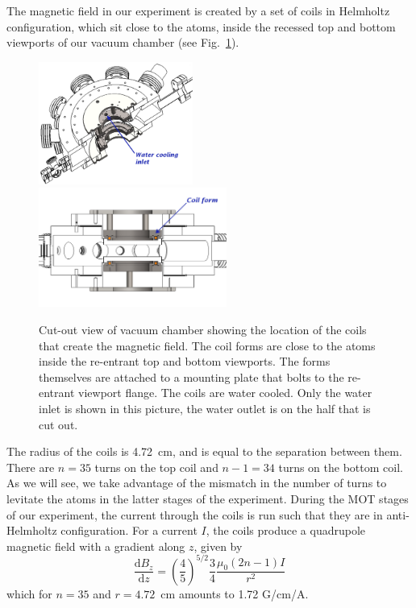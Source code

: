 The magnetic field in our experiment is created by a set of coils in
Helmholtz configuration, which sit close to the atoms, inside the recessed top
and bottom viewports of our vacuum chamber (see Fig.~\ref{fig:coilforms}).
\begin{figure} 
\includegraphics[width=0.45\textwidth]{../masters-figures/coils/angleview.pdf}
\includegraphics[width=0.55\textwidth]{../masters-figures/coils/sideview.pdf}
\caption[Location of magnetic field coil forms ]{\small Cut-out view of vacuum
chamber showing the location of the coils that create the magnetic field.   The
coil forms are close to the atoms inside the re-entrant top and bottom
viewports.  The forms themselves are attached to a mounting plate that bolts to
the re-entrant viewport flange.  The coils are water cooled.  Only  the water
inlet is shown in this picture, the water outlet is on the half that is cut
out. }
\label{fig:coilforms} 
\end{figure} 
The radius of the coils is 4.72~cm, and is equal to the separation between
them.  There are $n=35$ turns on the top coil and $n-1=34$ turns on the bottom
coil.  As we will see, we take advantage of the mismatch in the number of turns
to levitate the atoms in the latter stages of the experiment.  During the MOT
stages of our experiment, the current through the coils is run such that they
are in anti-Helmholtz configuration. For a current $I$,  the coils produce a
quadrupole magnetic field with a gradient along $z$, given by 
\begin{equation}
 \frac{ \mathrm{d}B_{z}}{ \mathrm{d}z}= \left(
\frac{4}{5} \right) ^{5/2} \frac{3}{4} \frac{\mu_{0} (2n-1) I } { r^{2} } 
\end{equation}
which for $n=35$ and $r=4.72$~cm amounts to 1.72 G/cm/A.

